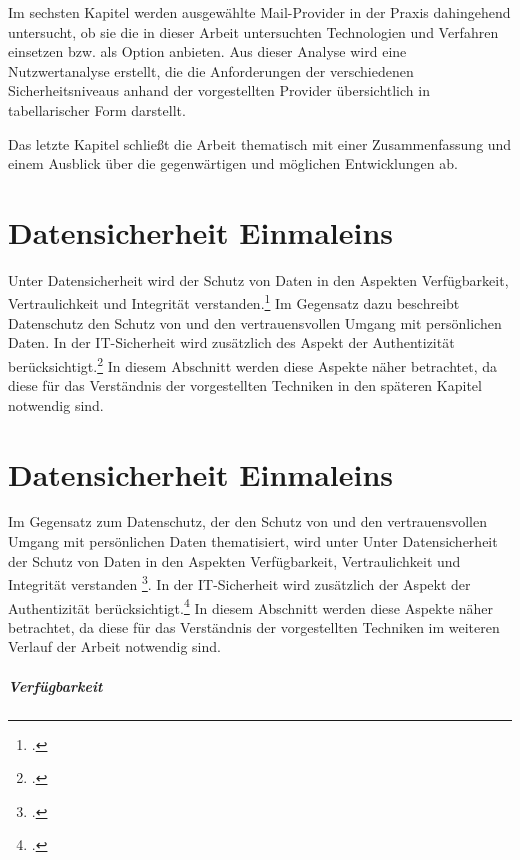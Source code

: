 \documentclass  [paper=a4,
				fontsize=12pt,
				listof=totoc,
				bibliography=totoc
				]{scrreprt}
\begin{document}
		Im sechsten Kapitel werden ausgewählte Mail-Provider in der Praxis dahingehend untersucht, ob sie die in dieser Arbeit untersuchten Technologien und Verfahren einsetzen bzw. als Option anbieten. Aus dieser Analyse wird eine Nutzwertanalyse erstellt, die die Anforderungen der verschiedenen Sicherheitsniveaus anhand der vorgestellten Provider übersichtlich in tabellarischer Form darstellt.
		
		Das letzte Kapitel schließt die Arbeit thematisch mit einer Zusammenfassung und einem Ausblick über die gegenwärtigen und möglichen Entwicklungen ab.
		
		

	\chapter{Datensicherheit Einmaleins}\label{sec:datensicherheit-einmaleins}
	Unter Datensicherheit wird der Schutz von Daten in den Aspekten Verfügbarkeit, Vertraulichkeit und Integrität verstanden.\footcite[Vgl.][]{BSI2014} Im Gegensatz dazu beschreibt Datenschutz den Schutz von und den vertrauensvollen Umgang mit persönlichen Daten. In der IT-Sicherheit wird zusätzlich des Aspekt der Authentizität berücksichtigt.\footcite[Vgl.][]{Berliner2014} In diesem Abschnitt werden diese Aspekte näher betrachtet, da diese für das Verständnis der vorgestellten Techniken in den späteren Kapitel notwendig sind.
	\chapter{Datensicherheit Einmaleins}
	Im Gegensatz zum Datenschutz, der den Schutz von und den vertrauensvollen Umgang mit persönlichen Daten thematisiert, wird unter Unter Datensicherheit der Schutz von Daten in den Aspekten Verfügbarkeit, Vertraulichkeit und Integrität verstanden \footcite[Vgl.][]{BSI2014}.  In der IT-Sicherheit wird zusätzlich der Aspekt der Authentizität berücksichtigt.\footcite[Vgl.][]{Berliner2014} In diesem Abschnitt werden diese Aspekte näher betrachtet, da diese für das Verständnis der vorgestellten Techniken im weiteren Verlauf der Arbeit notwendig sind.
	
	\paragraph{Verfügbarkeit}
	
\end{document}
